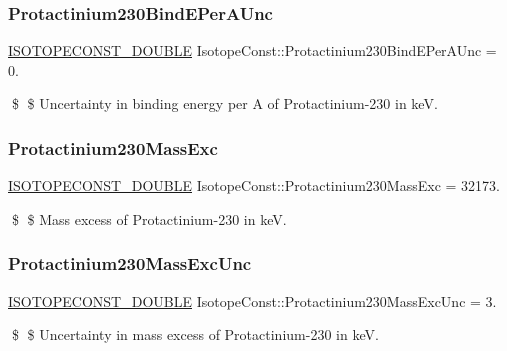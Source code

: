 \subsubsection{\texorpdfstring{Protactinium230\+Bind\+E\+Per\+A\+Unc}{Protactinium230BindEPerAUnc}}
{\footnotesize\ttfamily \mbox{\hyperlink{group___isotope_const-_macros_ga8f45a7272ce02c0b4c65c44636ed719a}{I\+S\+O\+T\+O\+P\+E\+C\+O\+N\+S\+T\+\_\+\+D\+O\+U\+B\+LE}} Isotope\+Const\+::\+Protactinium230\+Bind\+E\+Per\+A\+Unc = 0.}

\$ \$ Uncertainty in binding energy per A of Protactinium-\/230 in keV. \mbox{\label{group___isotope_const-_protactinium-_pa230_ga52dd11b1f4d611fd7f66fb3ea651b941}} 
\subsubsection{\texorpdfstring{Protactinium230\+Mass\+Exc}{Protactinium230MassExc}}
{\footnotesize\ttfamily \mbox{\hyperlink{group___isotope_const-_macros_ga8f45a7272ce02c0b4c65c44636ed719a}{I\+S\+O\+T\+O\+P\+E\+C\+O\+N\+S\+T\+\_\+\+D\+O\+U\+B\+LE}} Isotope\+Const\+::\+Protactinium230\+Mass\+Exc = 32173.}

\$ \$ Mass excess of Protactinium-\/230 in keV. \mbox{\label{group___isotope_const-_protactinium-_pa230_ga864cce7f05af9bf8b1bafdeccaa68cd4}} 
\subsubsection{\texorpdfstring{Protactinium230\+Mass\+Exc\+Unc}{Protactinium230MassExcUnc}}
{\footnotesize\ttfamily \mbox{\hyperlink{group___isotope_const-_macros_ga8f45a7272ce02c0b4c65c44636ed719a}{I\+S\+O\+T\+O\+P\+E\+C\+O\+N\+S\+T\+\_\+\+D\+O\+U\+B\+LE}} Isotope\+Const\+::\+Protactinium230\+Mass\+Exc\+Unc = 3.}

\$ \$ Uncertainty in mass excess of Protactinium-\/230 in keV. \mbox{\label{group___isotope_const-_protactinium-_pa230_ga01cb16ddaee92fb45916810faf99d9c9}} 
